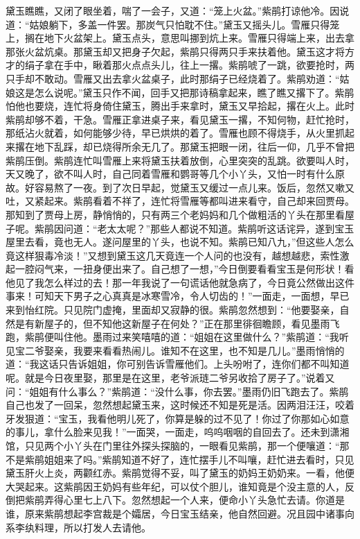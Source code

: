 \begin{parag}
    黛玉瞧瞧，又闭了眼坐着，喘了一会子，又道：“笼上火盆。”紫鹃打谅他冷。因说道：“姑娘躺下，多盖一件罢。那炭气只怕耽不住。”黛玉又摇头儿。雪雁只得笼上，搁在地下火盆架上。黛玉点头，意思叫挪到炕上来。雪雁只得端上来，出去拿那张火盆炕桌。那黛玉却又把身子欠起，紫鹃只得两只手来扶着他。黛玉这才将方才的绢子拿在手中，瞅着那火点点头儿，往上一撂。紫鹃唬了一跳，欲要抢时，两只手却不敢动。雪雁又出去拿火盆桌子，此时那绢子已经烧着了。紫鹃劝道：“姑娘这是怎么说呢。”黛玉只作不闻，回手又把那诗稿拿起来，瞧了瞧又撂下了。紫鹃怕他也要烧，连忙将身倚住黛玉，腾出手来拿时，黛玉又早拾起，撂在火上。此时紫鹃却够不着，干急。雪雁正拿进桌子来，看见黛玉一撂，不知何物，赶忙抢时，那纸沾火就着，如何能够少待，早已烘烘的着了。雪雁也顾不得烧手，从火里抓起来撂在地下乱踩，却已烧得所余无几了。那黛玉把眼一闭，往后一仰，几乎不曾把紫鹃压倒。紫鹃连忙叫雪雁上来将黛玉扶着放倒，心里突突的乱跳。欲要叫人时，天又晚了，欲不叫人时，自己同着雪雁和鹦哥等几个小丫头，又怕一时有什么原故。好容易熬了一夜。到了次日早起，觉黛玉又缓过一点儿来。饭后，忽然又嗽又吐，又紧起来。紫鹃看着不祥了，连忙将雪雁等都叫进来看守，自己却来回贾母。那知到了贾母上房，静悄悄的，只有两三个老妈妈和几个做粗活的丫头在那里看屋子呢。紫鹃因问道：“老太太呢？”那些人都说不知道。紫鹃听这话诧异，遂到宝玉屋里去看，竟也无人。遂问屋里的丫头，也说不知。紫鹃已知八九，”但这些人怎么竟这样狠毒冷淡！”又想到黛玉这几天竟连一个人问的也没有，越想越悲，索性激起一腔闷气来，一扭身便出来了。自己想了一想，”今日倒要看看宝玉是何形状！看他见了我怎么样过的去！那一年我说了一句谎话他就急病了，今日竟公然做出这件事来！可知天下男子之心真真是冰寒雪冷，令人切齿的！”一面走，一面想，早已来到怡红院。只见院门虚掩，里面却又寂静的很。紫鹃忽然想到：“他要娶亲，自然是有新屋子的，但不知他这新屋子在何处？”正在那里徘徊瞻顾，看见墨雨飞跑，紫鹃便叫住他。墨雨过来笑嘻嘻的道：“姐姐在这里做什么？”紫鹃道：“我听见宝二爷娶亲，我要来看看热闹儿。谁知不在这里，也不知是几儿。”墨雨悄悄的道：“我这话只告诉姐姐，你可别告诉雪雁他们。上头吩咐了，连你们都不叫知道呢。就是今日夜里娶，那里是在这里，老爷派琏二爷另收拾了房子了。”说着又问：“姐姐有什么事么？”紫鹃道：“没什么事，你去罢。”墨雨仍旧飞跑去了。紫鹃自己也发了一回呆，忽然想起黛玉来，这时候还不知是死是活。因两泪汪汪，咬着牙发狠道：“宝玉，我看他明儿死了，你算是躲的过不见了！你过了你那如心如意的事儿，拿什么脸来见我！”一面哭，一面走，呜呜咽咽的自回去了。还未到潇湘馆，只见两个小丫头在门里往外探头探脑的，一眼看见紫鹃，那一个便嚷道：“那不是紫鹃姐姐来了吗。”紫鹃知道不好了，连忙摆手儿不叫嚷，赶忙进去看时，只见黛玉肝火上炎，两颧红赤。紫鹃觉得不妥，叫了黛玉的奶妈王奶奶来。一看，他便大哭起来。这紫鹃因王奶妈有些年纪，可以仗个胆儿，谁知竟是个没主意的人，反倒把紫鹃弄得心里七上八下。忽然想起一个人来，便命小丫头急忙去请。你道是谁，原来紫鹃想起李宫裁是个孀居，今日宝玉结亲，他自然回避。况且园中诸事向系李纨料理，所以打发人去请他。
\end{parag}


